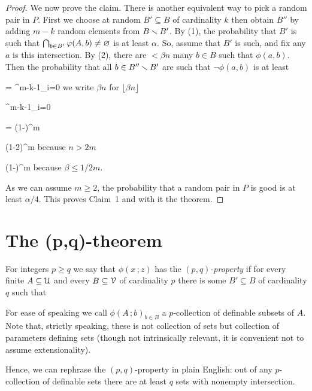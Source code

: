 \documentclass[scombinatorics.tex]{subfiles}
\begin{document}
\begin{proof}
We now prove the claim.
There is another equivalent way to pick a random pair in $P$.
First we choose at random $B'\subseteq B$ of cardinality $k$ then obtain $B''$ by adding $m-k$ random elements from $B\smallsetminus B'$.
By (1), the probability that $B'$ is such that $\bigcap_{b\in B'}\varphi(A,b)\neq\varnothing$ is at least $\alpha$.
So, assume that $B'$ is such, and fix any $a$ is this intersection.
By (2), there are $<\beta n$ many $b\in B$ such that $\phi(a,b)$.
Then the probability that all $b\in B''\smallsetminus B'$ are such that $\neg\phi(a,b)$ is at least\smallskip

{=}
{\prod^{m-k-1}_{i=0}}
\hfill we write $\beta n$ for $\lfloor \beta n \rfloor$

\ceq{}
{\ge}
{\prod^{m-k-1}_{i=0}}


\ceq{}
{=}
{\bigg(1-\bigg)^m}

\ceq{}
{\ge}
{\displaystyle(1-2\beta)^m\vphantom{\bigg)}}
\hfill because $n>2m$

\ceq{}
{\ge}
{\bigg(1-\bigg)^m}
\hfill because $\beta\le1/2m.$

As we can assume $m\ge 2$, the probability that a random pair in $P$ is good is at least $\alpha/4$.
This proves Claim~1 and with it the theorem.
\end{proof}


\section{The (p,q)-theorem}

For integers $p\ge q$ we say that $\phi(x\,;z)$ has the \emph{$(p,q)$-property\/} if for every finite $A\subseteq\EuScript U$ and every $B\subseteq\EuScript V$ of cardinality $p$ there is some $B'\subseteq B$ of cardinality $q$ such that

{\neq}
{\0}

For ease of speaking we call $\phi(A\,;b)_{b\in B}$ a $p$-collection of definable subsets of $A$.
Note that, strictly speaking, these is not collection of sets but collection of parameters defining sets (though not intrinsically relevant, it is convenient not to assume extensionality). 

Hence, we can rephrase the $(p,q)$-property in plain English: out of any $p$-collection of definable sets there are at least $q$ sets with nonempty intersection.
\end{document}
